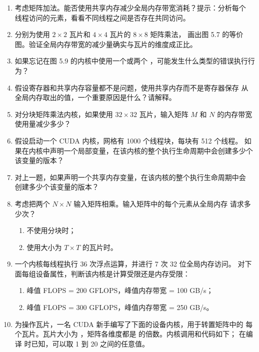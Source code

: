 \begin{enumerate}[label=\arabic*.,leftmargin=2.7em]
  \item 考虑矩阵加法。能否使用共享内存减少全局内存带宽消耗？提示：分析每个
  线程访问的元素，看看不同线程之间是否存在共同访问。

  \item 分别为使用 $2\times2$ 瓦片和 $4\times4$ 瓦片的 $8\times8$ 矩阵乘法，
  画出图 5.7 的等价图。验证全局内存带宽的减少量确实与瓦片的维度成正比。

  \item 如果忘记在图 5.9 的内核中使用一个或两个
  ，可能发生什么类型的错误执行行为？

  \item 假设寄存器和共享内存容量都不是问题，使用共享内存而不是寄存器保存
  从全局内存取出的值，一个重要原因是什么？请解释。

  \item 对分块矩阵乘法内核，如果使用 $32\times32$ 瓦片，输入矩阵 $M$ 和 $N$
  的内存带宽使用量减少多少？

  \item 假设启动一个 CUDA 内核，网格有 1000 个线程块，每块有 512 个线程。
  如果在内核中声明一个局部变量，在该内核的整个执行生命周期中会创建多少个
  该变量的版本？

  \item 对上一题，如果声明一个共享内存变量，在该内核的整个执行生命周期中会
  创建多少个该变量的版本？

  \item 考虑把两个 $N\times N$ 输入矩阵相乘。输入矩阵中的每个元素从全局内存
  请求多少次？
  \begin{enumerate}[label=\alph*.,leftmargin=2.2em]
    \item 不使用分块时；
    \item 使用大小为 $T\times T$ 的瓦片时。
  \end{enumerate}

  \item 一个内核每线程执行 36 次浮点运算，并进行 7 次 32 位全局内存访问。
  对下面每组设备属性，判断该内核是计算受限还是内存受限：
  \begin{enumerate}[label=\alph*.,leftmargin=2.2em]
    \item 峰值 FLOPS = 200 GFLOPS，峰值内存带宽 = 100 GB/s；
    \item 峰值 FLOPS = 300 GFLOPS，峰值内存带宽 = 250 GB/s。
  \end{enumerate}

  \item 为操作瓦片，一名 CUDA 新手编写了下面的设备内核，用于转置矩阵中的
  每个瓦片。瓦片大小为 ，矩阵各维度都是
   的倍数。内核调用和代码如下； 在编译
  时已知，可以取 1 到 20 之间的任意值。


\end{enumerate}
